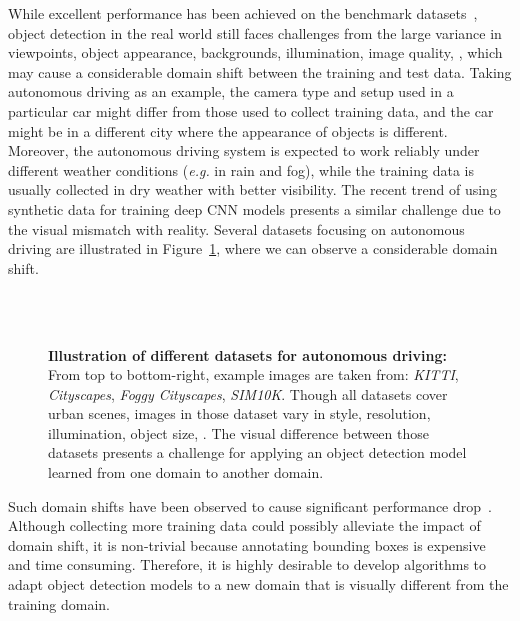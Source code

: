 \documentclass[10pt,twocolumn,letterpaper]{article}
\begin{document}
While excellent performance has been achieved on the benchmark datasets~\cite{everingham2010pascal,lin2014microsoft}, object detection in the real world still faces challenges from the large variance in viewpoints, object appearance, backgrounds, illumination, image quality, \etc, which may cause a considerable domain shift between the training and test data. Taking autonomous driving as an example, the camera type and setup used in a particular car might differ from those used to collect training data, and the car might be in a different city where the appearance of objects is different. Moreover, the autonomous driving system is expected to work reliably under different weather conditions (\textit{e.g.} in rain and fog), while the training data is usually collected in dry weather with better visibility. The recent trend of using synthetic data for training deep CNN models presents a similar challenge due to the visual mismatch with reality. Several datasets focusing on autonomous driving are illustrated in Figure~\ref{fig:ds_example}, where we can observe a considerable domain shift. 

\begin{figure}
\centering
      \\
      \\
\caption{\textbf{Illustration of different datasets for autonomous driving:} From top to bottom-right, example images are taken from: \textit{KITTI}\cite{geiger2013vision}, \textit{Cityscapes}\cite{cordts2016cityscapes}, \textit{Foggy Cityscapes}\cite{sakaridis2017semantic}, \textit{SIM10K}\cite{johnson2017driving}. Though all datasets cover urban scenes, images in those dataset vary in style, resolution, illumination, object size, \etc. The visual difference between those datasets presents a challenge for applying an object detection model learned from one domain to another domain.}
\label{fig:ds_example}
\vspace{-10pt}
\end{figure}
Such domain shifts have been observed to cause significant performance drop~\cite{gopalan2011domain}. Although collecting more training data could possibly alleviate the impact of domain shift, it is non-trivial because annotating bounding boxes is expensive and time consuming. Therefore, it is highly desirable to develop algorithms to adapt object detection models to a new domain that is visually different from the training domain.
\end{document}
